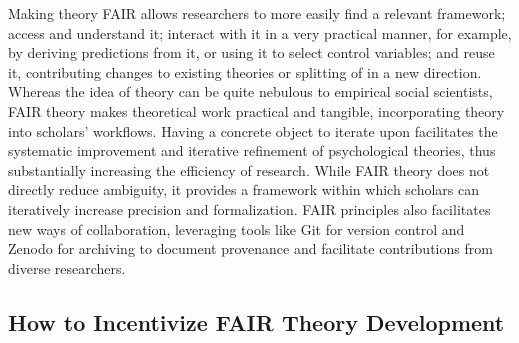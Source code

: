 \documentclass[
  man,floatsintext]{apa6}
\begin{document}
Making theory FAIR allows researchers to more easily find a relevant framework;
access and understand it; interact with it in a very practical manner, for example, by deriving predictions from it, or using it to select control variables; and reuse it, contributing changes to existing theories or splitting of in a new direction.
Whereas the idea of theory can be quite nebulous to empirical social scientists,
FAIR theory makes theoretical work practical and tangible, incorporating theory into scholars' workflows.
Having a concrete object to iterate upon facilitates the systematic improvement and iterative refinement of psychological theories, thus substantially increasing the efficiency of research.
While FAIR theory does not directly reduce ambiguity,
it provides a framework within which scholars can iteratively increase precision and formalization.
FAIR principles also facilitates new ways of collaboration,
leveraging tools like Git for version control and Zenodo for archiving to document provenance and facilitate contributions from diverse researchers.

\subsection{How to Incentivize FAIR Theory Development}\label{how-to-incentivize-fair-theory-development}
\end{document}
